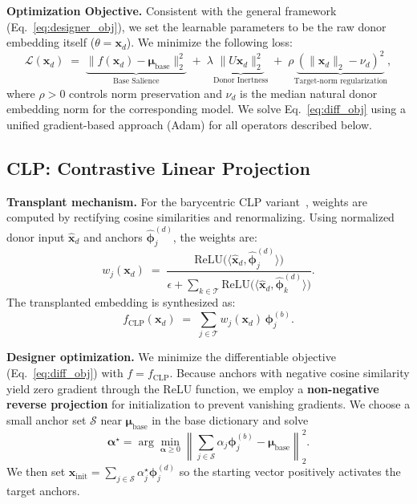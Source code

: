 \documentclass{article}
\theoremstyle{plain}
\theoremstyle{definition}
\theoremstyle{remark}
\begin{document}
\noindent\textbf{Optimization Objective.}
Consistent with the general framework (Eq.~\ref{eq:designer_obj}), we set the learnable parameters to be the raw donor embedding itself ($\theta = \mathbf{x}_d$). We minimize the following loss:
\begin{equation}
\label{eq:diff_obj}
    \mathcal{L}(\mathbf{x}_d)
    \;=\;
    \underbrace{\|f(\mathbf{x}_d) - \boldsymbol{\mu}_{\text{base}}\|_2^2}_{\text{Base Salience}}
    \;+\;
    \lambda \underbrace{\|U \mathbf{x}_d\|_2^2}_{\text{Donor Inertness}}
    \;+\;
    \rho \underbrace{(\|\mathbf{x}_d\|_2-\nu_d)^2}_{\text{Target-norm regularization}},
\end{equation}
where $\rho>0$ controls norm preservation and $\nu_d$ is the median natural donor embedding norm for the corresponding model.
We solve Eq.~\ref{eq:diff_obj} using a unified gradient-based approach (Adam) for all operators described below.
\subsection{CLP: Contrastive Linear Projection}
\label{sec:clp-breaker}

\noindent\textbf{Transplant mechanism.}
For the barycentric CLP variant~\citep{ostendorff2023efficient}, weights are computed by rectifying cosine similarities and renormalizing.
Using normalized donor input $\widehat{\mathbf{x}}_d$ and anchors $\widehat{\boldsymbol{\phi}}^{(d)}_j$, the weights are:
\begin{equation}
\label{eq:clp_w}
w_j(\mathbf{x}_d)
\;=\;
\frac{\mathrm{ReLU}\!\big(\langle \widehat{\mathbf{x}}_d, \widehat{\boldsymbol{\phi}}^{(d)}_j\rangle\big)}
{\epsilon + \sum_{k\in\mathcal{T}} \mathrm{ReLU}\!\big(\langle \widehat{\mathbf{x}}_d, \widehat{\boldsymbol{\phi}}^{(d)}_k\rangle\big)}.
\end{equation}
The transplanted embedding is synthesized as:
\begin{equation}
\label{eq:clp_func}
f_{\text{CLP}}(\mathbf{x}_d)
\;=\;
\sum_{j\in\mathcal{T}} w_j(\mathbf{x}_d)\,\boldsymbol{\phi}^{(b)}_j.
\end{equation}

\noindent\textbf{Designer optimization.}
We minimize the differentiable objective (Eq.~\ref{eq:diff_obj}) with $f=f_{\text{CLP}}$.
Because anchors with negative cosine similarity yield zero gradient through the ReLU function, we employ a \textbf{non-negative reverse projection} for initialization to prevent vanishing gradients.
We choose a small anchor set $\mathcal{S}$ near $\boldsymbol{\mu}_{\text{base}}$ in the base dictionary and solve
\[
\boldsymbol{\alpha}^\star
=
\arg\min_{\boldsymbol{\alpha}\ge 0}
\left\|\sum_{j\in\mathcal{S}}\alpha_j\boldsymbol{\phi}^{(b)}_j-\boldsymbol{\mu}_{\text{base}}\right\|_2^2.
\]
We then set $\mathbf{x}_{\text{init}}=\sum_{j\in\mathcal{S}}\alpha^\star_j\boldsymbol{\phi}^{(d)}_j$ so the starting vector positively activates the target anchors.
\end{document}
